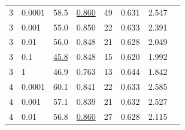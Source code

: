 \documentclass[12pt]{jarticle}
\numberwithin{equation}{section}    %
\numberwithin{figure}{section}      %
\numberwithin{table}{section}      %
\begin{document}
\begin{table}[bt]
\begin{center}
{\begin{tabular}{|c|l|rrrrrr|}
                \hline
                3                        & 0.0001                                   & 58.5                         & \underline{0.860}         & 49                         & 0.631                         & 2.547                             &                                    \\
                3                        & 0.001                                    & 55.0                         & 0.850                     & 22                         & 0.633                         & 2.391                             &                                    \\
                3                        & 0.01                                     & 56.0                         & 0.848                     & 21                         & 0.628                         & 2.049                             &                                    \\
                3                        & 0.1                                      & \underline{45.8}             & 0.848                     & 15                         & 0.620                         & 1.992                             &                                    \\
                3                        & 1                                        & 46.9                         & 0.763                     & 13                         & 0.644                         & 1.842                             &                                    \\
                \hline
                4                        & 0.0001                                   & 60.1                         & 0.841                     & 22                         & 0.633                         & 2.585                             &                                    \\
                4                        & 0.001                                    & 57.1                         & 0.839                     & 21                         & 0.632                         & 2.527                             &                                    \\
                4                        & 0.01                                     & 56.8                         & \underline{0.860}         & 27                         & 0.628                         & 2.115                             &                                    \\

\end{tabular}}
\end{center}
\end{table}
\end{document}
